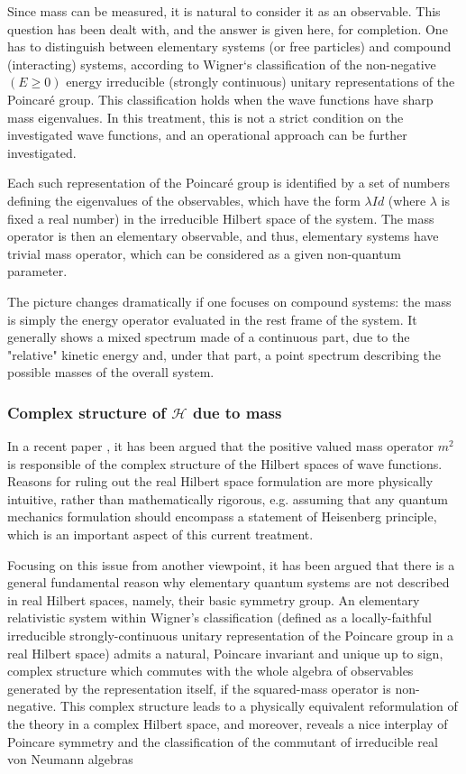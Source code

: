 \documentclass[a4paper,10pt]{article}
\numberwithin{equation}{section}
\begin{document}
Since mass can be measured, it is natural to consider it as an observable. This question has been dealt with, and the answer is given here, for completion. One has to distinguish between elementary systems (or free particles) and compound (interacting) systems, according to Wigner`s classification \cite{WignerClassification} of the non-negative $(E ≥ 0)$ energy irreducible (strongly continuous) unitary representations of the Poincaré group. This classification holds when the wave functions have sharp mass eigenvalues. In this treatment, this is not a strict condition on the investigated wave functions, and an operational approach can be further investigated.

Each such representation of the Poincaré group is identified by a set of numbers defining the eigenvalues of the observables, which have the form $\lambda Id$ (where $\lambda$ is fixed a real number) in the irreducible Hilbert space of the system. The mass operator is then an  elementary observable, and thus, elementary systems have trivial mass operator, which can be considered as a given non-quantum parameter.

The picture changes dramatically if one focuses on compound systems: the mass is simply the energy operator evaluated in the rest frame of the system. It generally shows a mixed spectrum made of a continuous part, due to the "relative" kinetic energy and, under that part, a point spectrum describing the possible masses of the overall system.

\subsubsection{Complex structure of $\mathcal{H}$ due to mass }

In a recent paper \cite{MassGivingComplexStructure}, it has been argued that the positive valued  mass operator $m^2$ is responsible of the complex structure of the Hilbert spaces of wave functions. Reasons for ruling out the real Hilbert space formulation are more physically intuitive, rather than mathematically rigorous, e.g. assuming that any quantum mechanics formulation should encompass a statement of Heisenberg principle, which is an important aspect of this current treatment.

Focusing on this issue from another viewpoint, it has been argued that there is a general fundamental reason why elementary quantum systems are not described in real Hilbert spaces, namely, their basic symmetry group. An elementary relativistic system within Wigner’s classification (defined as a locally-faithful irreducible strongly-continuous unitary representation of the Poincare group in a real Hilbert space) admits a natural, Poincare invariant and unique up to sign, complex structure which commutes with the whole algebra of observables generated by the representation itself, if the squared-mass operator is non-negative. This complex structure leads to a physically equivalent reformulation of the theory in a complex Hilbert space, and moreover, reveals a nice interplay of Poincare symmetry and the classification of the commutant of irreducible real von Neumann algebras
\end{document}
